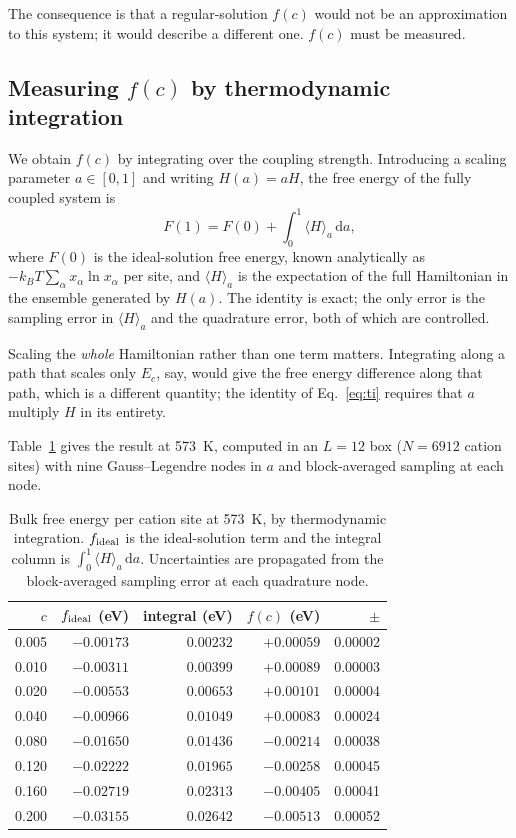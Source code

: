\documentclass[11pt,a4paper]{article}
\begin{document}
The consequence is that a regular-solution $f(c)$ would not be an approximation
to this system; it would describe a different one. $f(c)$ must be measured.

\subsection{Measuring $f(c)$ by thermodynamic integration}
\label{sec:fofc}

We obtain $f(c)$ by integrating over the coupling strength. Introducing a
scaling parameter $a \in [0,1]$ and writing $H(a) = aH$, the free energy of the
fully coupled system is
\begin{equation}
F(1) = F(0) + \int_0^1 \langle H \rangle_a \, \mathrm{d}a,
\label{eq:ti}
\end{equation}
where $F(0)$ is the ideal-solution free energy, known analytically as
$-k_BT \sum_\alpha x_\alpha \ln x_\alpha$ per site, and $\langle H \rangle_a$ is
the expectation of the full Hamiltonian in the ensemble generated by $H(a)$.
The identity is exact; the only error is the sampling error in
$\langle H \rangle_a$ and the quadrature error, both of which are controlled.

Scaling the \emph{whole} Hamiltonian rather than one term matters. Integrating
along a path that scales only $E_c$, say, would give the free energy difference
along that path, which is a different quantity; the identity of
Eq.~\eqref{eq:ti} requires that $a$ multiply $H$ in its entirety.

Table~\ref{tab:fofc} gives the result at 573~K, computed in an $L = 12$ box
($N = 6912$ cation sites) with nine Gauss--Legendre nodes in $a$ and
block-averaged sampling at each node.

\begin{table}[htbp]
\centering
\caption{Bulk free energy per cation site at 573~K, by thermodynamic
integration. $f_{\rm ideal}$ is the ideal-solution term and the integral column
is $\int_0^1 \langle H\rangle_a\,\mathrm{d}a$. Uncertainties are propagated from
the block-averaged sampling error at each quadrature node.}
\label{tab:fofc}
\small
\begin{tabular}{rrrrr}
\toprule
$c$ & $f_{\rm ideal}$ (eV) & integral (eV) & $f(c)$ (eV) & $\pm$ \\
\midrule
0.005 & $-0.00173$ & $0.00232$ & $+0.00059$ & 0.00002 \\
0.010 & $-0.00311$ & $0.00399$ & $+0.00089$ & 0.00003 \\
0.020 & $-0.00553$ & $0.00653$ & $+0.00101$ & 0.00004 \\
0.040 & $-0.00966$ & $0.01049$ & $+0.00083$ & 0.00024 \\
0.080 & $-0.01650$ & $0.01436$ & $-0.00214$ & 0.00038 \\
0.120 & $-0.02222$ & $0.01965$ & $-0.00258$ & 0.00045 \\
0.160 & $-0.02719$ & $0.02313$ & $-0.00405$ & 0.00041 \\
0.200 & $-0.03155$ & $0.02642$ & $-0.00513$ & 0.00052 \\
\bottomrule
\end{tabular}
\end{table}
\end{document}
